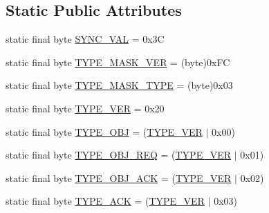 \subsection*{Static Public Attributes}
\begin{DoxyCompactItemize}
\item 
static final byte \hyperlink{classorg_1_1taulabs_1_1uavtalk_1_1_u_a_v_talk_definitions_ab9a3933958fa17bdca2c3f17277e8303}{S\-Y\-N\-C\-\_\-\-V\-A\-L} = 0x3\-C
\item 
static final byte \hyperlink{classorg_1_1taulabs_1_1uavtalk_1_1_u_a_v_talk_definitions_a8eea7af49e3c741562806cf8460f4100}{T\-Y\-P\-E\-\_\-\-M\-A\-S\-K\-\_\-\-V\-E\-R} = (byte)0x\-F\-C
\item 
static final byte \hyperlink{classorg_1_1taulabs_1_1uavtalk_1_1_u_a_v_talk_definitions_a6ccf2b527d322fdf522976dfcdae2054}{T\-Y\-P\-E\-\_\-\-M\-A\-S\-K\-\_\-\-T\-Y\-P\-E} = (byte)0x03
\item 
static final byte \hyperlink{classorg_1_1taulabs_1_1uavtalk_1_1_u_a_v_talk_definitions_af6183c1302cd3c3ea3e7a4bb929c73ea}{T\-Y\-P\-E\-\_\-\-V\-E\-R} = 0x20
\item 
static final byte \hyperlink{classorg_1_1taulabs_1_1uavtalk_1_1_u_a_v_talk_definitions_a8d3182c07dcec00e768a95276d933f3b}{T\-Y\-P\-E\-\_\-\-O\-B\-J} = (\hyperlink{classorg_1_1taulabs_1_1uavtalk_1_1_u_a_v_talk_definitions_af6183c1302cd3c3ea3e7a4bb929c73ea}{T\-Y\-P\-E\-\_\-\-V\-E\-R} $|$ 0x00)
\item 
static final byte \hyperlink{classorg_1_1taulabs_1_1uavtalk_1_1_u_a_v_talk_definitions_aa74f8daf3b9aa068ac33662627f7ebbd}{T\-Y\-P\-E\-\_\-\-O\-B\-J\-\_\-\-R\-E\-Q} = (\hyperlink{classorg_1_1taulabs_1_1uavtalk_1_1_u_a_v_talk_definitions_af6183c1302cd3c3ea3e7a4bb929c73ea}{T\-Y\-P\-E\-\_\-\-V\-E\-R} $|$ 0x01)
\item 
static final byte \hyperlink{classorg_1_1taulabs_1_1uavtalk_1_1_u_a_v_talk_definitions_aa928ea5500dca695f867128fe890741f}{T\-Y\-P\-E\-\_\-\-O\-B\-J\-\_\-\-A\-C\-K} = (\hyperlink{classorg_1_1taulabs_1_1uavtalk_1_1_u_a_v_talk_definitions_af6183c1302cd3c3ea3e7a4bb929c73ea}{T\-Y\-P\-E\-\_\-\-V\-E\-R} $|$ 0x02)
\item 
static final byte \hyperlink{classorg_1_1taulabs_1_1uavtalk_1_1_u_a_v_talk_definitions_a2108eedbfe1b9c6fd6dbc497282b444c}{T\-Y\-P\-E\-\_\-\-A\-C\-K} = (\hyperlink{classorg_1_1taulabs_1_1uavtalk_1_1_u_a_v_talk_definitions_af6183c1302cd3c3ea3e7a4bb929c73ea}{T\-Y\-P\-E\-\_\-\-V\-E\-R} $|$ 0x03)
\end{DoxyCompactItemize}


